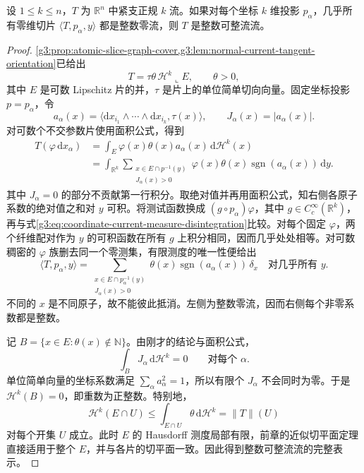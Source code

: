\begin{theorem}\label{g3:thm:atomic-slice-rectifiability}
	设 \(1\le k\le n\)，\(T\) 为 \(\mathbb R^n\) 中紧支正规 \(k\) 流。如果对每个坐标 \(k\) 维投影 \(p_\alpha\)，几乎所有零维切片
	\(\langle T,p_\alpha,y\rangle\) 都是整数零流，则 \(T\) 是整数可整流流。
\end{theorem}
\begin{proof}
	\cref{g3:prop:atomic-slice-graph-cover,g3:lem:normal-current-tangent-orientation}已给出
	\[
		T=\tau\theta\,\mathcal H^k\llcorner E,\qquad \theta>0,
	\]
	其中 \(E\) 是可数 Lipschitz 片的并，\(\tau\) 是片上的单位简单切向向量。固定坐标投影 \(p=p_\alpha\)，令
	\[
		a_\alpha(x)=\langle\mathrm dx_{i_1}\wedge\cdots
		\wedge\mathrm dx_{i_k},\tau(x)\rangle,\qquad
		J_\alpha(x)=|a_\alpha(x)|.
	\]
	对可数个不交参数片使用面积公式，得到
	\begin{align*}
		T(\varphi\,\mathrm dx_\alpha)
		&=\int_E\varphi(x)\theta(x)a_\alpha(x)\,\mathrm d\mathcal H^k(x)\\
		&=\int_{\mathbb R^k}
		\sum_{\substack{x\in E\cap p^{-1}(y)\\J_\alpha(x)>0}}
		\varphi(x)\theta(x)\operatorname{sgn}(a_\alpha(x))\,\mathrm dy.
	\end{align*}
	其中 \(J_\alpha=0\) 的部分不贡献第一行积分。取绝对值并再用面积公式，知右侧各原子系数的绝对值之和对 \(y\) 可积。将测试函数换成 \((g\circ p_\alpha)\varphi\)，其中 \(g\in C_c^\infty(\mathbb R^k)\)，再与式\eqref{g3:eq:coordinate-current-measure-disintegration}比较。对每个固定 \(\varphi\)，两个纤维配对作为 \(y\) 的可积函数在所有 \(g\) 上积分相同，因而几乎处处相等。对可数稠密的 \(\varphi\) 族删去同一个零测集，有限测度的唯一性便给出
	\begin{equation}\label{g3:eq:slice-reads-integer-multiplicity}
		\langle T,p_\alpha,y\rangle
		=\sum_{\substack{x\in E\cap p_\alpha^{-1}(y)\\J_\alpha(x)>0}}
		\theta(x)\operatorname{sgn}(a_\alpha(x))\,\delta_x
		\quad\text{对几乎所有 }y.
	\end{equation}
	不同的 \(x\) 是不同原子，故不能彼此抵消。左侧为整数零流，因而右侧每个非零系数都是整数。

	记 \(B=\{x\in E:\theta(x)\notin\mathbb N\}\)。由刚才的结论与面积公式，
	\[
		\int_BJ_\alpha\,\mathrm d\mathcal H^k=0
		\qquad\text{对每个 }\alpha.
	\]
	单位简单向量的坐标系数满足
	\(\sum_\alpha a_\alpha^2=1\)，所以有限个 \(J_\alpha\) 不会同时为零。于是 \(\mathcal H^k(B)=0\)，即重数为正整数。特别地，
	\[
		\mathcal H^k(E\cap U)
		\le\int_{E\cap U}\theta\,\mathrm d\mathcal H^k
		=\|T\|(U)
	\]
	对每个开集 \(U\) 成立。此时 \(E\) 的 Hausdorff 测度局部有限，前章的近似切平面定理直接适用于整个 \(E\)，并与各片的切平面一致。因此得到整数可整流流的完整表示。
\end{proof}

